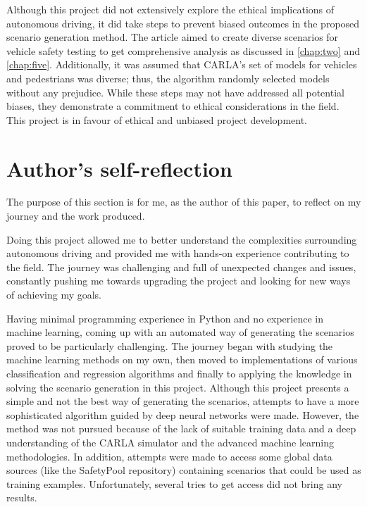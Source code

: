 Although this project did not extensively explore the ethical implications of autonomous driving, it did take steps to prevent biased outcomes in the proposed scenario generation method. The article aimed to create diverse scenarios for vehicle safety testing to get comprehensive analysis as discussed in \autoref{chap:two} and \autoref{chap:five}. Additionally, it was assumed that CARLA's set of models for vehicles and pedestrians was diverse; thus, the algorithm randomly selected models without any prejudice. While these steps may not have addressed all potential biases, they demonstrate a commitment to ethical considerations in the field. This project is in favour of ethical and unbiased project development.

\section{Author's self-reflection} \label{sect-10.5}

The purpose of this section is for me, as the author of this paper, to reflect on my journey and the work produced. 

Doing this project allowed me to better understand the complexities surrounding autonomous driving and provided me with hands-on experience contributing to the field. The journey was challenging and full of unexpected changes and issues, constantly pushing me towards upgrading the project and looking for new ways of achieving my goals.
 
Having minimal programming experience in Python and no experience in machine learning, coming up with an automated way of generating the scenarios proved to be particularly challenging. The journey began with studying the machine learning methods on my own, then moved to implementations of various classification and regression algorithms and finally to applying the knowledge in solving the scenario generation in this project. Although this project presents a simple and not the best way of generating the scenarios, attempts to have a more sophisticated algorithm guided by deep neural networks were made. However, the method was not pursued because of the lack of suitable training data and a deep understanding of the CARLA simulator and the advanced machine learning methodologies. In addition, attempts were made to access some global data sources (like the SafetyPool repository\cite{safetypool}) containing scenarios that could be used as training examples. Unfortunately, several tries to get access did not bring any results.

